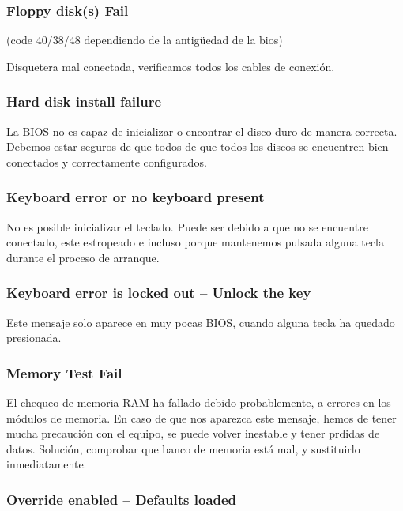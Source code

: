 		\subsubsection{Floppy disk(s) Fail} 
		
		(code 40/38/48 dependiendo de la antigüedad de la bios)

		Disquetera mal conectada, verificamos todos los cables de conexión.

		\subsubsection{Hard disk install failure}

		La BIOS no es capaz de inicializar o encontrar el disco duro de
		manera correcta. Debemos estar seguros de que todos de que todos
		los discos se encuentren bien conectados y correctamente
		configurados.

		\subsubsection{Keyboard error or no keyboard present}

		No es posible inicializar el teclado. Puede ser debido a que no se
		encuentre conectado, este estropeado e incluso porque mantenemos
		pulsada alguna tecla durante el proceso de arranque.

		\subsubsection{Keyboard error is locked out – Unlock the key}

		Este mensaje solo aparece en muy pocas BIOS, cuando alguna tecla ha
		quedado presionada. 

		\subsubsection{Memory Test Fail}

		El chequeo de memoria RAM ha fallado debido probablemente, a
		errores en los módulos de memoria. En caso de que nos aparezca este
		mensaje, hemos de tener mucha precaución con el equipo, se puede
		volver inestable y tener prdidas de datos. Solución, comprobar que
		banco de memoria está mal, y sustituirlo inmediatamente. 

		\subsubsection{Override enabled – Defaults loaded}


